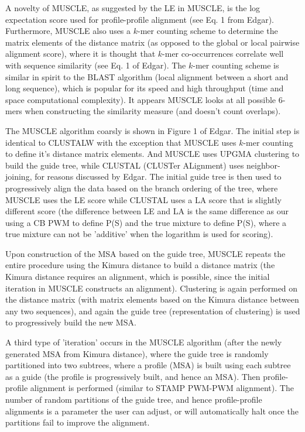 	A novelty of MUSCLE, as suggested by the LE in MUSCLE, is the log expectation score used for profile-profile alignment (see Eq. 1 from Edgar\cite{pmid15034147}).  Furthermore, MUSCLE also uses a $k$-mer counting scheme to determine the matrix elements of the distance matrix (as opposed to the global or local pairwise alignment score), where it is thought that $k$-mer co-occurrences correlate well with sequence similarity (see Eq. 1 of Edgar\cite{pmid15318951}).  The $k$-mer counting scheme is similar in spirit to the BLAST algorithm (local alignment between a short and long sequence), which is popular for its speed and high throughput (time and space computational complexity).  It appears MUSCLE looks at all possible 6-mers when constructing the similarity measure (and doesn't count overlaps). 
	
	The MUSCLE algorithm coarsly is shown in Figure 1 of Edgar\cite{}.  The initial step is identical to CLUSTALW with the exception that MUSCLE uses $k$-mer counting to define it's distance matrix elements.  And MUSCLE uses UPGMA clustering to build the guide tree, while CLUSTAL (CLUSTer ALignment) uses neighbor-joining, for reasons discussed by Edgar\cite{}.  The initial guide tree is then used to progressively align the data based on the branch ordering of the tree, where MUSCLE uses the LE score while CLUSTAL uses a LA score that is slightly different score (the difference between LE and LA is the same difference as our using a CB PWM to define P(S) and the true mixture to define P(S), where a true mixture can not be 'additive' when the logarithm is used for scoring).
	
	Upon construction of the MSA based on the guide tree, MUSCLE repeats the entire procedure using the Kimura distance to build a distance matrix (the Kimura distance requires an alignment, which is possible, since the initial iteration in MUSCLE constructs an alignment).  Clustering is again performed on the distance matrix (with matrix elements based on the Kimura distance between any two sequences), and again the guide tree (representation of clustering) is used to progressively build the new MSA.  
	
	A third type of 'iteration' occurs in the MUSCLE algorithm (after the newly generated MSA from Kimura distance), where the guide tree is randomly partitioned into two subtrees, where a profile (MSA) is built using each subtree as a guide  (the profile is progressively built, and hence an MSA).  Then profile-profile alignment is performed (similar to STAMP PWM-PWM alignment).  The number of random partitions of the guide tree, and hence profile-profile alignments is a parameter the user can adjust, or will automatically halt once the partitions fail to improve the alignment.  

